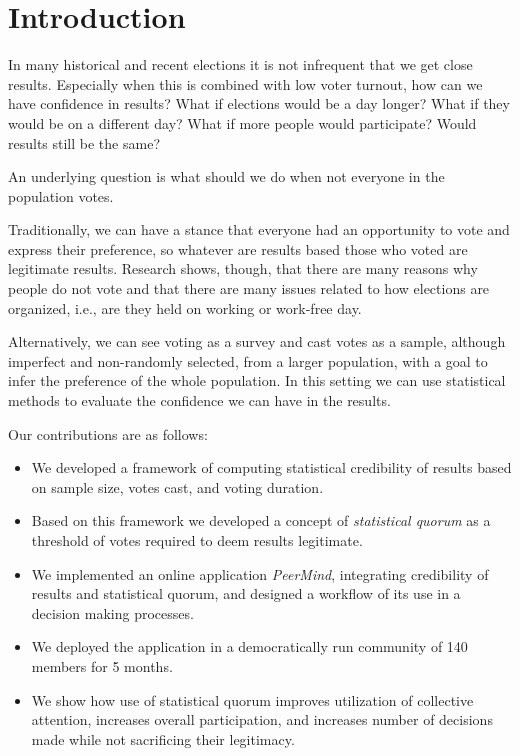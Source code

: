 \documentclass[chi_draft]{sigchi}
\begin{document}
\section{Introduction}

In many historical and recent elections it is not infrequent that we get close results.
Especially when this is combined with low voter turnout, how can we have confidence in results?
What if elections would be a day longer? What if they would be on a different day? What if
more people would participate? Would results still be the same?

An underlying question is what should we do when not everyone in the population votes.

Traditionally, we can have a stance that everyone had an opportunity to vote and express
their preference, so whatever are results based those who voted are legitimate results.
Research shows, though, that there are many reasons why people do not vote and that there
are many issues related to how elections are organized, i.e., are they held on working
or work-free day.

Alternatively, we can see voting as a survey and cast votes as a sample, although imperfect
and non-randomly selected, from a larger population, with a goal to infer the preference
of the whole population. In this setting we can use statistical methods to evaluate the
confidence we can have in the results.

Our contributions are as follows:

\begin{itemize}
\item We developed a framework of computing statistical credibility of results
based on sample size, votes cast, and voting duration.
\item Based on this framework we developed a concept of \emph{statistical quorum}
as a threshold of votes required to deem results legitimate.
\item We implemented an online application \emph{PeerMind},
integrating credibility of results and statistical quorum, and designed
a workflow of its use in a decision making processes.
\item We deployed the application in a democratically run community of 140
members for 5 months.
\item We show how use of statistical quorum improves utilization of collective
attention, increases overall participation, and increases number of decisions made
while not sacrificing their legitimacy.
\end{itemize}
\end{document}
